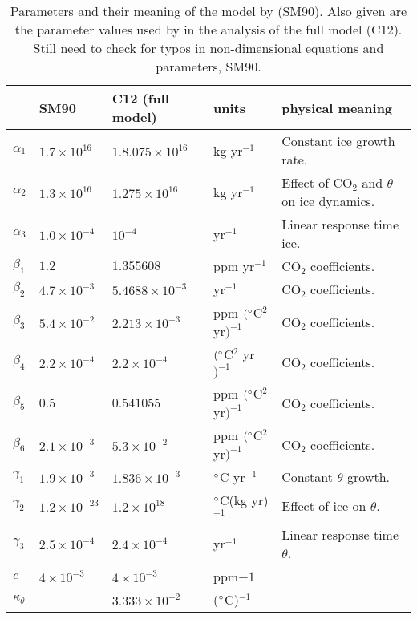 \documentclass[12pt]{article}
\begin{document}
\begin{table}[b!]
\begin{tabular}{lllll}
\hline
& SM90 & C12 (full model) & units & physical meaning \\
\hline
$\alpha_1$ & $1.7\times 10^{16}$ & $1.8.075\times10^{16}$ & kg yr$^{-1}$  & Constant ice growth rate. \\
$\alpha_2$ & $1.3\times 10^{16}$ & $1.275\times10^{16}$ & kg yr$^{-1}$ & Effect of CO$_2$ and $\theta$ on ice dynamics.\\
$\alpha_3$ & $1.0\times 10^{-4}$  & $10^{-4}$ & yr$^{-1}$ & Linear response time ice.\\
$\beta_1$  & $1.2$ & $1.355608$ & ppm yr$^{-1}$& CO$_2$ coefficients.\\
$\beta_2$ & $4.7\times 10^{-3}$ & $ 5.4688\times 10^{-3}$ & yr$^{-1}$ & CO$_2$ coefficients.\\
$\beta_3$ & $5.4\times 10^{-2}$ & $2.213\times 10^{-3}$ & ppm $(\degree$C$^2$ yr$)^{-1}$ & CO$_2$ coefficients.\\
$\beta_4$ & $2.2\times 10^{-4}$ & $2.2\times 10^{-4}$ & $(\degree$C$^2$ yr$)^{-1}$   & CO$_2$ coefficients.\\
$\beta_5$ & $0.5$ & $0.541055$ & ppm $(\degree$C$^2$ yr$)^{-1}$ & CO$_2$ coefficients.\\
$\beta_6$ & $2.1\times 10^{-3}$ & $5.3\times 10^{-2}$ & ppm $(\degree$C$^2$ yr$)^{-1}$ & CO$_2$ coefficients.\\
$\gamma_1$ & $1.9\times 10^{-3}$ & $1.836\times 10^{-3}$ & $\degree$C yr$^{-1}$ & Constant $\theta$ growth.\\
$\gamma_2$ & $1.2\times 10^{-23}$ & $1.2\times 10^{18}$ & $\degree$C(kg yr)$^{-1}$ & Effect of ice on $\theta$.\\
$\gamma_3$ & $2.5\times 10^{-4}$ & $2.4\times 10^{-4}$ & yr$^{-1}$ & Linear response time $\theta$.\\
$c$ & $4\times 10^{-3}$ &$4\times 10^{-3}$ & ppm${-1}$ & \\
$\kappa_\theta$ & & $3.333\times 10^{-2}$ & ($\degree$C)$^{-1}$ &\\
\hline
\end{tabular}
\label{t:SM90}
\caption{Parameters and their meaning of the model by \cite{Saltzman:1990uy} (SM90). Also given are the parameter values used by \cite{Crucifix2012a} in the analysis of the full model (C12). {\color{red} Still need to check for typos in non-dimensional equations and parameters, SM90.} }
\end{table}
\end{document}
